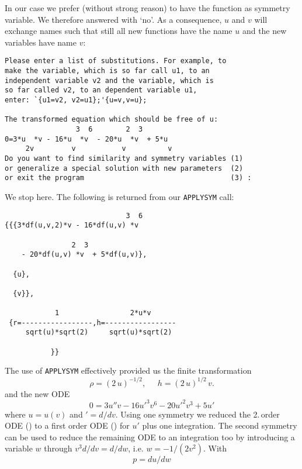 In our case we prefer (without strong reason) to have the function as
symmetry variable. We therefore answered with `no'. As a consequence, $u$ and
$v$ will exchange names such that still all new functions have the name $u$
and the new variables have name $v$:
{\small \begin{verbatim}
Please enter a list of substitutions. For example, to
make the variable, which is so far call u1, to an
independent variable v2 and the variable, which is
so far called v2, to an dependent variable u1,
enter: `{u1=v2, v2=u1};'{u=v,v=u};

The transformed equation which should be free of u:
                 3  6        2  3
0=3*u  *v - 16*u  *v  - 20*u  *v  + 5*u
     2v         v           v          v
Do you want to find similarity and symmetry variables (1)
or generalize a special solution with new parameters  (2)
or exit the program                                   (3) :
\end{verbatim}}
We stop here. The following is returned from our \texttt{APPLYSYM} call:
\begin{small}
\begin{verbatim}
                             3  6
{{{3*df(u,v,2)*v - 16*df(u,v) *v

                2  3
    - 20*df(u,v) *v  + 5*df(u,v)},

  {u},

  {v}},

            1                 2*u*v
 {r=-----------------,h=-----------------
     sqrt(u)*sqrt(2)     sqrt(u)*sqrt(2)

           }}
\end{verbatim}
\end{small}
The use of \texttt{APPLYSYM} effectively provided us the finite
transformation
\begin{equation}
  \rho=(2\,u)^{-1/2},\;\;\;\;\;h=(2\,u)^{1/2}\,v \label{trafo1}.
\end{equation}
and the new ODE
\begin{equation}
0 = 3u''v - 16u'^3v^6 - 20u'^2v^3 + 5u'        \label{udgl}
\end{equation}
where $u=u(v)$ and $'=d/dv.$
Using one symmetry we reduced the 2.\,order ODE ()
to a first order ODE () for $u'$ plus one
integration. The second symmetry can be used to reduce the remaining ODE
to an integration too by introducing a variable $w$ through $v^3d/dv = d/dw$,
i.e. $w = -1/(2v^2)$. With
\begin{equation}
p=du/dw                                       \label{udot}
\end{equation}
